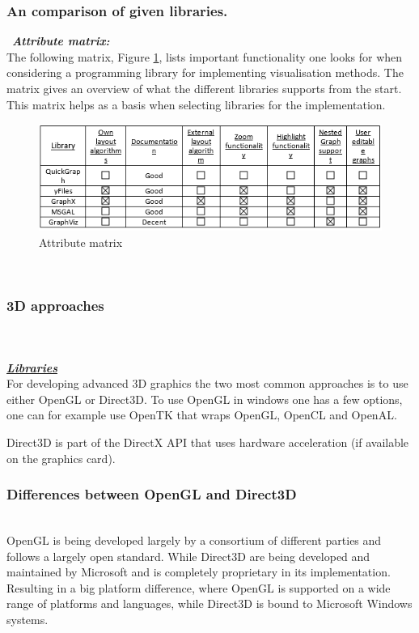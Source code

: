 \documentclass[a4paper,11pt]{kth-mag}
\begin{document}
\begin{appendices}
\subsubsection{An comparison of given libraries.}
\
\textbf{\textit{Attribute matrix:}}\
\newline
\\
The following matrix, Figure \ref{fig:libAttributeMatrix:appendix}, lists important functionality one looks for when considering a programming library for implementing visualisation methods. The matrix gives an overview of what the 
different libraries supports from the start. This matrix helps as a basis when selecting libraries for the implementation.\\

\begin{figure}[!htbp]
	\centering
	\includegraphics[scale=1.0]{LibraryAttributeMatrix}
	\caption{Attribute matrix}
	\label{fig:libAttributeMatrix:appendix}
\end{figure}
\\
\subsubsection{3D approaches}\\
\\
\newline
\textbf{\textit{\underline{Libraries}}}\\
\newline
For developing advanced 3D graphics the two most common approaches is to use either OpenGL\cite{website:OpenGL} or Direct3D\cite{website:Direct3D}. To use OpenGL in windows one has a few options, one can for example use
 OpenTK that wraps OpenGL, OpenCL\cite{website:OpenCL} and OpenAL\cite{website:OpenAL}. 

Direct3D is part of the DirectX API that uses hardware acceleration (if available on the graphics card).
\\
\subsubsection{Differences between OpenGL and Direct3D}\\
\newline
OpenGL is being developed largely by a consortium of different parties and follows a largely open standard. While Direct3D are being developed 
and maintained by Microsoft and is completely proprietary in its implementation. Resulting in a big platform difference, where OpenGL is supported on a wide range of platforms and languages,
while Direct3D is bound to Microsoft Windows systems. 


\end{appendices}
\end{document}
